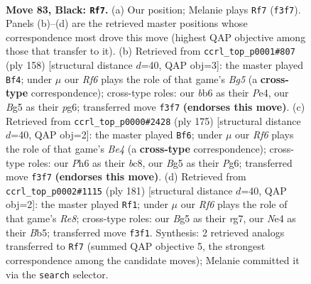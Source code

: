 \documentclass[11pt]{article}
\begin{document}
\clearpage

\begin{figure}[p]\centering
\begin{subfigure}{0.46\textwidth}\centering
\resizebox{\linewidth}{!}{%
\newchessgame
\chessboard[
  setfen={8/8/1B2k2p/3pp1b1/1K2n2p/5r2/1R6/8 b - - 1 83},
  showmover=false,
  pgfstyle=straightmove, color=movearrow, markmove={f3-f7}
]}
\caption{}
\end{subfigure}\hfill
\begin{subfigure}{0.46\textwidth}\centering
\resizebox{\linewidth}{!}{%
\newchessgame
\chessboard[
  setfen={8/3b1k2/6p1/6B1/4P2P/4KP2/8/8 w - - 29 80},
  showmover=false,
  pgfstyle=straightmove, color=movearrow, markmove={g5-f4}
]}
\caption{}
\end{subfigure}
\\[4pt]
\begin{subfigure}{0.46\textwidth}\centering
\resizebox{\linewidth}{!}{%
\newchessgame
\chessboard[
  setfen={2B5/8/3p2p1/2p1b1k1/2P5/1P1K2n1/5R2/8 b - - 48 88},
  showmover=false,
  pgfstyle=straightmove, color=movearrow, markmove={e5-f6}
]}
\caption{}
\end{subfigure}\hfill
\begin{subfigure}{0.46\textwidth}\centering
\resizebox{\linewidth}{!}{%
\newchessgame
\chessboard[
  setfen={8/6R1/p7/1b3P1p/3K3k/1B6/8/4r3 b - - 1 91},
  showmover=false,
  pgfstyle=straightmove, color=movearrow, markmove={e1-f1}
]}
\caption{}
\end{subfigure}
\caption{\textbf{Move 83, Black: \texttt{Rf7}.} (a) Our position; Melanie plays \texttt{Rf7} (\texttt{f3f7}). Panels (b)--(d) are the retrieved master positions whose correspondence most drove this move (highest QAP objective among those that transfer to it). (b) Retrieved from \texttt{ccrl\_top\_p0001\#807} (ply 158) [structural distance $d$=40, QAP obj=3]: the master played \texttt{Bf4}; under $\mu$ our \emph{Rf6} plays the role of that game's \emph{Bg5} (a \textbf{cross-type} correspondence); cross-type roles: our \emph{b}b6 as their \emph{P}e4, our \emph{B}g5 as their \emph{p}g6; transferred move \texttt{f3f7} \textbf{(endorses this move)}. (c) Retrieved from \texttt{ccrl\_top\_p0000\#2428} (ply 175) [structural distance $d$=40, QAP obj=2]: the master played \texttt{Bf6}; under $\mu$ our \emph{Rf6} plays the role of that game's \emph{Be4} (a \textbf{cross-type} correspondence); cross-type roles: our \emph{P}h6 as their \emph{b}c8, our \emph{B}g5 as their \emph{P}g6; transferred move \texttt{f3f7} \textbf{(endorses this move)}. (d) Retrieved from \texttt{ccrl\_top\_p0002\#1115} (ply 181) [structural distance $d$=40, QAP obj=2]: the master played \texttt{Rf1}; under $\mu$ our \emph{Rf6} plays the role of that game's \emph{Re8}; cross-type roles: our \emph{B}g5 as their \emph{r}g7, our \emph{N}e4 as their \emph{B}b5; transferred move \texttt{f3f1}. Synthesis: 2 retrieved analogs transferred to \texttt{Rf7} (summed QAP objective 5, the strongest correspondence among the candidate moves); Melanie committed it via the \texttt{search} selector.}
\label{fig:thought-m165}
\end{figure}
\end{document}

